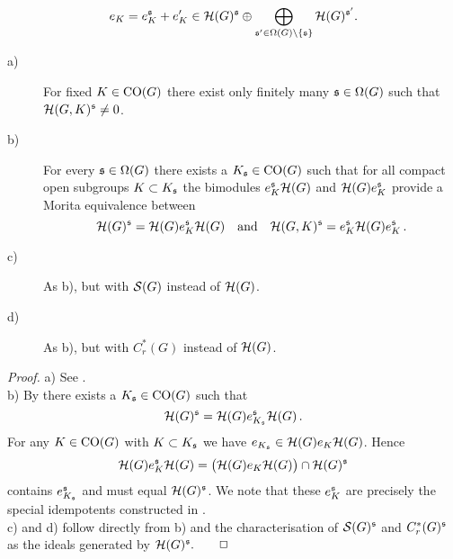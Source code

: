 \begin{equation}
e_K = e_K^{\mathfrak s} + e'_K \in \mathcal H (G)^{\mathfrak s} \oplus
\bigoplus_{\mathfrak s' \in \Omega (G) \setminus \{\mathfrak s\} } \mathcal H (G)^{\mathfrak s'} .
\end{equation}
\begin{prop}\label{prop:2.1}
\begin{description}
\item[a)] For fixed $K \in \mathrm{CO}(G)$ there exist only finitely
many $\mathfrak s \in \Omega (G)$ such that $\mathcal H (G,K)^{\mathfrak s} \neq 0$.
\item[b)] For every $\mathfrak s \in \Omega (G)$ there exists a $K_{\mathfrak s}
\in \mathrm{CO}(G)$ such that for all compact open subgroups $K
\subset K_{\mathfrak s}$ the bimodules $e_K^{\mathfrak s} \mathcal H (G)$ and $\mathcal
H (G) e_K^{\mathfrak s}$ provide a Morita equivalence between 
\[
\mathcal H (G)^{\mathfrak s} = \mathcal H (G) e_K^{\mathfrak s} \mathcal H (G) \quad \text{and}  
\quad \mathcal H (G,K)^{\mathfrak s} = e_K^{\mathfrak s} \mathcal H (G) e_K^{\mathfrak s} \,.
\]
\item[c)] As \textup{b)}, but with $\mathcal S (G)$ instead of $\mathcal H (G)$.
\item[d)] As \textup{b)}, but with $C_r^* (G)$ instead of $\mathcal H (G)$.
\end{description}
\end{prop}
\emph{Proof.} a) See \cite[\S 3.7]{BeDe}.\\
b) By \cite[Corollaire 3.9]{BeDe} there exists a $K_{\mathfrak s} \in \mathrm{CO}(G)$ such that
\[
\mathcal H (G)^{\mathfrak s} = \mathcal H (G) e_{K_{\mathfrak s}}^{\mathfrak s} \mathcal H (G) \,.
\]
For any $K \in \mathrm{CO}(G)$ with $K \subset K_{\mathfrak s}$ we have 
$e_{K_{\mathfrak s}} \in \mathcal H (G) e_K \mathcal H (G)$. Hence
\[
\mathcal H (G) e_K^{\mathfrak s} \mathcal H (G) = \big( \mathcal H (G) e_K \mathcal H (G) \big) \cap \mathcal H (G)^{\mathfrak s}
\]
contains $e_{K_{\mathfrak s}}^{\mathfrak s}$ and must equal $\mathcal H (G)^{\mathfrak s}$.
We note that these $e^{\mathfrak s}_K$ are precisely the special idempotents
constructed in \cite[Proposition 3.13]{BuKu}. \\
c) and d) follow directly from b) and the characterisation of 
$\mathcal S (G)^{\mathfrak s}$ and $C_r^* (G)^{\mathfrak s}$ as the ideals 
generated by $\mathcal H (G)^{\mathfrak s}. \qquad \Box$
\\[2mm]

